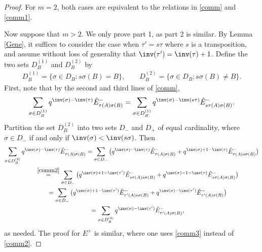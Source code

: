 \begin{proof}
	For $m=2$, both cases are equivalent to the relations in \eqref{comm} and \eqref{comm1}.
	
	Now suppose that $ m>2$. We only prove part 1, as part 2 is similar. By Lemma \ref{Gene}, it suffices to consider the case when $\tau'=s\tau$ where $s$ is a transposition, and assume without loss of generality that $\inv(\tau')= \inv(\tau)+1$. Define the two sets $D_B^{(1)}$ and $D_B^{(2)}$ by
	\begin{gather*}
		D_B^{(1)}= \{ \sigma \in D_B \colon s \sigma(B)=B \},\qquad
		D_B^{(2)}= \{ \sigma \in D_B \colon s \sigma(B) \neq B \}.
	\end{gather*}	
	First, note that by the second and third lines of \eqref{comm},
\[
	\sum_{\sigma\in D_B^{(1)}} q^{\inv(\sigma)-\inv(\tau)} \hat{E}^-_{\tau(A) \sigma (B)} = \sum_{\sigma\in D_B^{(1)}} q^{\inv(\sigma)-\inv(s\tau)} \hat{E}^-_{s \tau(A) \sigma (B)} .
\]
	Partition the set $D_B^{(2)}$ into two sets $D_-$ and $D_+$ of equal cardinality, where $\sigma \in D_-$ if and only if $\inv(\sigma) < \inv(s \sigma)$. Then
	\begin{gather*}
	\sum_{\sigma\in D_B^{(2)}} q^{\inv(\sigma)-\inv(\tau)} \hat{E}^-_{\tau(A) \sigma (B)} = \sum_{\sigma \in D_-} \big( q^{\inv(\sigma)-\inv(\tau)} \hat{E}^-_{\tau(A) \sigma (B)} + q^{\inv(\sigma)+1-\inv(\tau)} \hat{E}^-_{\tau(A) s\sigma (B)} \big) \\
\qquad \stackrel{\eqref{comm2}}{=} \sum_{\sigma \in D_-} \big( q^{\inv(\sigma)+1-\inv(\tau')} \hat{E}^-_{s\tau(A) s\sigma (B)} + q^{\inv(\sigma)-1-\inv(\tau)} \hat{E}^-_{s\tau(A) \sigma (B)} \big)\\
\qquad =\sum_{\sigma \in D_-} \big( q^{\inv(\sigma)+1-\inv(\tau')} \hat{E}^-_{\tau'(A) s\sigma (B)} + q^{\inv(\sigma)-\inv(\tau')} \hat{E}^-_{\tau'(A) \sigma (B)}\big)\\
\qquad =\sum_{\sigma\in D_B^{(2)}} q^{\inv(\sigma)-\inv(\tau')} \hat{E}^-_{\tau'(A) \sigma (B)} ,
	\end{gather*}
	as needed.
	The proof for $E^+$ is similar, where one uses \eqref{comm3} instead of \eqref{comm2}.
\end{proof}
